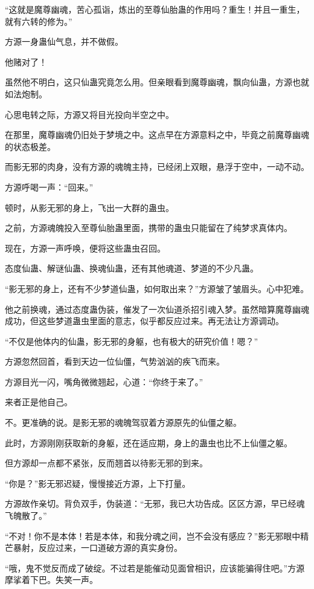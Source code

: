 \begin{this_body}
“这就是魔尊幽魂，苦心孤诣，炼出的至尊仙胎蛊的作用吗？重生！并且一重生，就有六转的修为。”

方源一身蛊仙气息，并不做假。

他赌对了！

虽然他不明白，这只仙蛊究竟怎么用。但亲眼看到魔尊幽魂，飘向仙蛊，方源也就如法炮制。

心思电转之际，方源又将目光投向半空之中。

在那里，魔尊幽魂仍旧处于梦境之中。这点早在方源意料之中，毕竟之前魔尊幽魂的状态极差。

而影无邪的肉身，没有方源的魂魄主持，已经闭上双眼，悬浮于空中，一动不动。

方源呼喝一声：“回来。”

顿时，从影无邪的身上，飞出一大群的蛊虫。

之前，方源魂魄投入至尊仙胎蛊里面，携带的蛊虫只能留在了纯梦求真体内。

现在，方源一声呼唤，便将这些蛊虫召回。

态度仙蛊、解谜仙蛊、换魂仙蛊，还有其他魂道、梦道的不少凡蛊。

“影无邪的身上，还有不少梦道仙蛊，如何取出来？”方源皱了皱眉头。心中犯难。

他之前换魂，通过态度蛊伪装，催发了一次仙道杀招引魂入梦。虽然暗算魔尊幽魂成功，但这些梦道蛊虫里面的意志，似乎都反应过来。再无法让方源调动。

“不仅是他体内的仙蛊，影无邪的身躯，也有极大的研究价值！嗯？”

方源忽然回首，看到天边一位仙僵，气势汹汹的疾飞而来。

方源目光一闪，嘴角微微翘起，心道：“你终于来了。”

来者正是他自己。

不。更准确的说。是影无邪的魂魄驾驭着方源原先的仙僵之躯。

此时，方源刚刚获取新的身躯，还在适应期，身上的蛊虫也比不上仙僵之躯。

但方源却一点都不紧张，反而翘首以待影无邪的到来。

“你是？”影无邪迟疑，慢慢接近方源，上下打量。

方源故作亲切。背负双手，伪装道：“无邪，我已大功告成。区区方源，早已经魂飞魄散了。”

“不对！你不是本体！若是本体，和我分魂之间，岂不会没有感应？”影无邪眼中精芒暴射，反应过来，一口道破方源的真实身份。

“哦，鬼不觉反而成了破绽。不过若是能催动见面曾相识，应该能骗得住吧。”方源摩挲着下巴。失笑一声。


\end{this_body}
